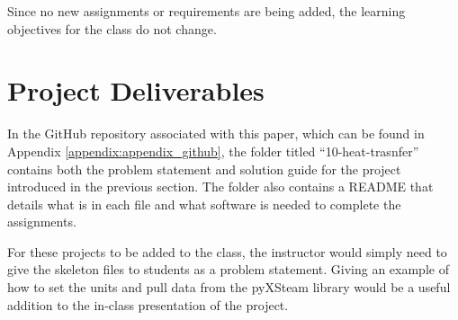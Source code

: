 Since no new assignments or requirements are being added, the learning objectives
for the class do not change. 

\section{Project Deliverables}

In the GitHub repository associated with this paper, which can be found in 
Appendix \ref{appendix:appendix_github}, the folder titled ``10-heat-trasnfer''
contains both the problem statement and solution guide for the project introduced in 
the previous section. The folder also contains a README that details what is in each file and 
what software is needed to complete the assignments. 

For these projects to be added to the class, the instructor would simply need to give the 
skeleton files to students as a problem statement. Giving an example of how to set the units
and pull data from the pyXSteam library would be a useful addition to the in-class presentation
of the project.
